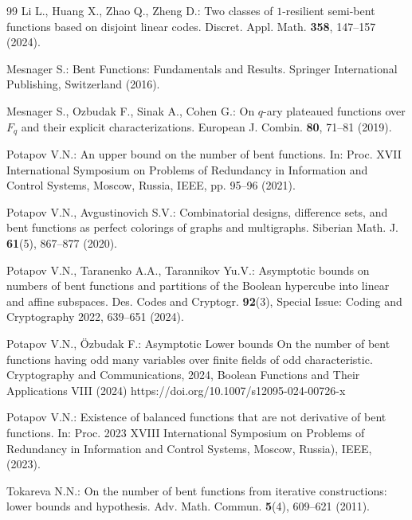 \documentclass[a4paper,12pt]{article}   %
\begin{document}
\begin{thebibliography}{99}
 Li L., Huang X.,  Zhao Q., Zheng D.: Two classes of
$1$-resilient semi-bent functions based on disjoint linear codes.
Discret. Appl. Math. {\bf 358}, 147--157 (2024).



 Mesnager S.: Bent Functions: Fundamentals and Results.
Springer International Publishing, Switzerland (2016).

 Mesnager S., Ozbudak F.,  Sinak A.,  Cohen G.: On $q$-ary
 plateaued functions over $F_q$ and their explicit characterizations.  European J. Combin. {\bf 80},
 71--81 (2019).



 Potapov V.N.:  An upper bound on the number of bent functions. In:
 Proc.
 XVII International Symposium on Problems of Redundancy in
Information and Control Systems, Moscow, Russia, IEEE, pp. 95--96
(2021). %


  Potapov V.N.,   Avgustinovich S.V.:  Combinatorial designs, difference
sets, and bent functions as perfect colorings of graphs and
multigraphs. Siberian Math. J. {\bf 61}(5), 867--877 (2020).



 Potapov  V.N.,  Taranenko A.A.,  Tarannikov Yu.V.:
 Asymptotic bounds on numbers of bent functions and partitions of the
 Boolean hypercube into linear and affine subspaces.
Des. Codes and Cryptogr.  {\bf 92}(3), Special Issue: Coding and
Cryptography 2022,  639--651  (2024). %


 Potapov  V.N.,  \"{O}zbudak F.:
Asymptotic Lower bounds On the number of bent functions having odd
many variables over finite fields of odd characteristic.
Cryptography and Communications, 2024, Boolean Functions and Their
Applications VIII (2024) https://doi.org/10.1007/s12095-024-00726-x

Potapov V.N.: Existence of balanced functions that are not
derivative of bent functions. In:
 Proc. 2023 XVIII International Symposium on
Problems of Redundancy in Information and Control Systems, Moscow,
Russia), IEEE, (2023).



Tokareva N.N.: On the number of bent functions from iterative
constructions: lower bounds and hypothesis. Adv. Math. Commun. {\bf
5}(4), 609--621 (2011).




\end{thebibliography}
\end{document}
